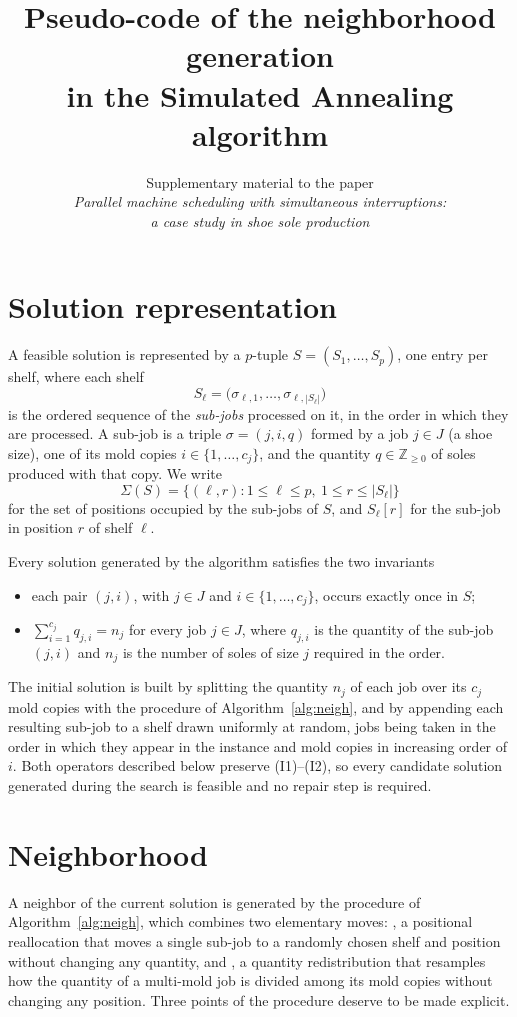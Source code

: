 \documentclass[11pt]{article}
\title{Pseudo-code of the neighborhood generation\\ in the Simulated Annealing algorithm}
\author{Supplementary material to the paper\\
\emph{Parallel machine scheduling with simultaneous interruptions:}\\
\emph{a case study in shoe sole production}}
\date{}
\begin{document}
\maketitle

\section*{Solution representation}

A feasible solution is represented by a $p$-tuple $S=(S_1,\dots,S_p)$, one entry
per shelf, where each shelf
\[
  S_\ell = \bigl(\sigma_{\ell,1},\dots,\sigma_{\ell,|S_\ell|}\bigr)
\]
is the ordered sequence of the \emph{sub-jobs} processed on it, in the order in
which they are processed. A sub-job is a triple $\sigma=(j,i,q)$ formed by a job
$j\in J$ (a shoe size), one of its mold copies $i \in \{1,\dots,c_j\}$, and the
quantity $q\in\mathbb{Z}_{\geq 0}$ of soles produced with that copy. We write
\[
  \Sigma(S) = \bigl\{(\ell,r) : 1\leq \ell \leq p,\ 1 \leq r \leq |S_\ell| \bigr\}
\]
for the set of positions occupied by the sub-jobs of $S$, and $S_\ell[r]$ for the
sub-job in position $r$ of shelf $\ell$.

Every solution generated by the algorithm satisfies the two invariants
\begin{itemize}
  \item[(I1)] each pair $(j,i)$, with $j\in J$ and $i\in\{1,\dots,c_j\}$, occurs
    exactly once in $S$;
  \item[(I2)] $\sum_{i=1}^{c_j} q_{j,i} = n_j$ for every job $j \in J$, where
    $q_{j,i}$ is the quantity of the sub-job $(j,i)$ and $n_j$ is the number of
    soles of size $j$ required in the order.
\end{itemize}
The initial solution is built by splitting the quantity $n_j$ of each job over
its $c_j$ mold copies with the procedure \Split{} of Algorithm~\ref{alg:neigh},
and by appending each resulting sub-job to a shelf drawn uniformly at random,
jobs being taken in the order in which they appear in the instance and mold
copies in increasing order of $i$. Both operators described below preserve
(I1)--(I2), so every candidate solution generated during the search is feasible
and no repair step is required.

\section*{Neighborhood}

A neighbor of the current solution is generated by the procedure \TwoStep{} of
Algorithm~\ref{alg:neigh}, which combines two elementary moves:
\Relocate{}, a positional reallocation that moves a single sub-job to a randomly
chosen shelf and position without changing any quantity, and \Redistribute{},
a quantity redistribution that resamples how the quantity of a multi-mold job is
divided among its mold copies without changing any position. Three points of the
procedure deserve to be made explicit.
\end{document}
